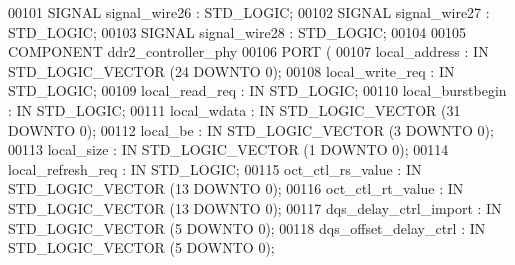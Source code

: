 \begin{DoxyCode}
{00101     \textcolor{keywordflow}{SIGNAL} \textcolor{vhdlchar}{signal_wire26}    \textcolor{vhdlchar}{:}  \textcolor{comment}{STD\_LOGIC};
00102     \textcolor{keywordflow}{SIGNAL} \textcolor{vhdlchar}{signal_wire27}    \textcolor{vhdlchar}{:}  \textcolor{comment}{STD\_LOGIC};
00103     \textcolor{keywordflow}{SIGNAL} \textcolor{vhdlchar}{signal_wire28}    \textcolor{vhdlchar}{:}  \textcolor{comment}{STD\_LOGIC};
00104 
00105     \textcolor{keywordflow}{COMPONENT} ddr2_controller_phy
00106     \textcolor{keywordflow}{PORT} (
00107         local_address   : \textcolor{keywordflow}{IN} \textcolor{comment}{STD\_LOGIC\_VECTOR} (\textcolor{vhdllogic}{}\textcolor{vhdllogic}{24} \textcolor{keywordflow}{DOWNTO} \textcolor{vhdllogic}{}\textcolor{vhdllogic}{0});
00108         local_write_req : \textcolor{keywordflow}{IN} \textcolor{comment}{STD\_LOGIC};
00109         local_read_req  : \textcolor{keywordflow}{IN} \textcolor{comment}{STD\_LOGIC};
00110         local_burstbegin    : \textcolor{keywordflow}{IN} \textcolor{comment}{STD\_LOGIC};
00111         local_wdata : \textcolor{keywordflow}{IN} \textcolor{comment}{STD\_LOGIC\_VECTOR} (\textcolor{vhdllogic}{}\textcolor{vhdllogic}{31} \textcolor{keywordflow}{DOWNTO} \textcolor{vhdllogic}{}\textcolor{vhdllogic}{0});
00112         local_be    : \textcolor{keywordflow}{IN} \textcolor{comment}{STD\_LOGIC\_VECTOR} (\textcolor{vhdllogic}{}\textcolor{vhdllogic}{3} \textcolor{keywordflow}{DOWNTO} \textcolor{vhdllogic}{}\textcolor{vhdllogic}{0});
00113         local_size  : \textcolor{keywordflow}{IN} \textcolor{comment}{STD\_LOGIC\_VECTOR} (\textcolor{vhdllogic}{}\textcolor{vhdllogic}{1} \textcolor{keywordflow}{DOWNTO} \textcolor{vhdllogic}{}\textcolor{vhdllogic}{0});
00114         local_refresh_req   : \textcolor{keywordflow}{IN} \textcolor{comment}{STD\_LOGIC};
00115         oct_ctl_rs_value    : \textcolor{keywordflow}{IN} \textcolor{comment}{STD\_LOGIC\_VECTOR} (\textcolor{vhdllogic}{}\textcolor{vhdllogic}{13} \textcolor{keywordflow}{DOWNTO} \textcolor{vhdllogic}{}\textcolor{vhdllogic}{0});
00116         oct_ctl_rt_value    : \textcolor{keywordflow}{IN} \textcolor{comment}{STD\_LOGIC\_VECTOR} (\textcolor{vhdllogic}{}\textcolor{vhdllogic}{13} \textcolor{keywordflow}{DOWNTO} \textcolor{vhdllogic}{}\textcolor{vhdllogic}{0});
00117         dqs_delay_ctrl_import   : \textcolor{keywordflow}{IN} \textcolor{comment}{STD\_LOGIC\_VECTOR} (\textcolor{vhdllogic}{}\textcolor{vhdllogic}{5} \textcolor{keywordflow}{DOWNTO} \textcolor{vhdllogic}{}\textcolor{vhdllogic}{0});
00118         dqs_offset_delay_ctrl   : \textcolor{keywordflow}{IN} \textcolor{comment}{STD\_LOGIC\_VECTOR} (\textcolor{vhdllogic}{}\textcolor{vhdllogic}{5} \textcolor{keywordflow}{DOWNTO} \textcolor{vhdllogic}{}\textcolor{vhdllogic}{0});
}
\end{DoxyCode}
